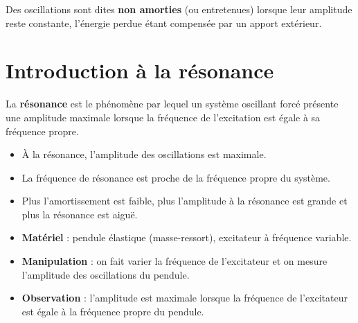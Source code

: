 \begin{definition}
Des oscillations sont dites \textbf{non amorties} (ou entretenues) lorsque leur amplitude reste constante, l'énergie perdue étant compensée par un apport extérieur.
\end{definition}

\begin{illus}
\end{illus}

\section{Introduction à la résonance}

\begin{definition}[Résonance]
La \textbf{résonance} est le phénomène par lequel un système oscillant forcé présente une amplitude maximale lorsque la fréquence de l'excitation est égale à sa fréquence propre.
\end{definition}

\begin{propriete}
\begin{itemize}
\item À la résonance, l'amplitude des oscillations est maximale.
\item La fréquence de résonance est proche de la fréquence propre du système.
\item Plus l'amortissement est faible, plus l'amplitude à la résonance est grande et plus la résonance est aiguë.
\end{itemize}
\end{propriete}

\begin{experience}
\begin{itemize}
\item \textbf{Matériel} : pendule élastique (masse-ressort), excitateur à fréquence variable.
\item \textbf{Manipulation} : on fait varier la fréquence de l'excitateur et on mesure l'amplitude des oscillations du pendule.
\item \textbf{Observation} : l'amplitude est maximale lorsque la fréquence de l'excitateur est égale à la fréquence propre du pendule.
\end{itemize}
\end{experience}

